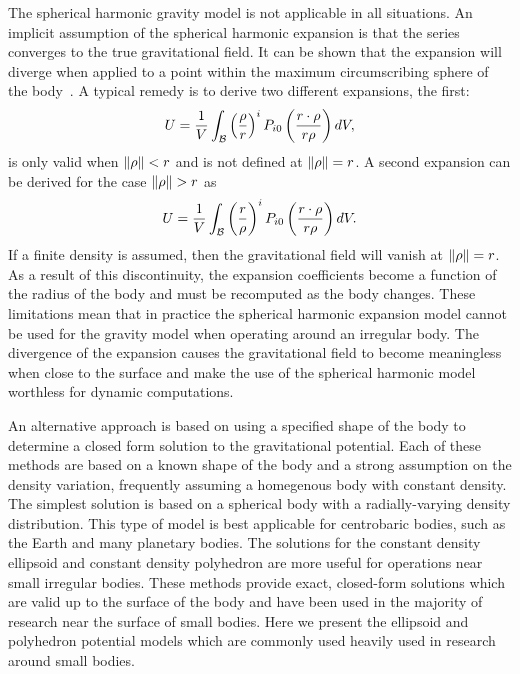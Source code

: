 The spherical harmonic gravity model is not applicable in all situations.
An implicit assumption of the spherical harmonic expansion is that the series converges to the true gravitational field.
It can be shown that the expansion will diverge when applied to a point within the maximum circumscribing sphere of the body~\cite{scheeres2012a}.
A typical remedy is to derive two different expansions, the first:
\begin{align}
    U = \frac{1}{V} \int_{\mathcal{B}} \left(  \frac{\rho}{r} \right)^i P_{i0} \left(  \frac{r \cdot \rho}{ r \rho} \right) dV, 
\end{align}
is only valid when \( \left\| \rho \right\| < r \) and is not defined at \( \left\| \rho \right\| = r\).
A second expansion can be derived for the case \(\left\| \rho \right\| > r \) as
\begin{align}
    U = \frac{1}{V} \int_{\mathcal{B}} \left(  \frac{r}{\rho} \right)^i P_{i0} \left(  \frac{r \cdot \rho}{ r \rho} \right) dV. 
\end{align}
If a finite density is assumed, then the gravitational field will vanish at \( \left\| \rho \right\| = r \).
As a result of this discontinuity, the expansion coefficients become a function of the radius of the body and must be recomputed as the body changes.
These limitations mean that in practice the spherical harmonic expansion model cannot be used for the gravity model when operating around an irregular body.
The divergence of the expansion causes the gravitational field to become meaningless when close to the surface and make the use of the spherical harmonic model worthless for dynamic computations.


An alternative approach is based on using a specified shape of the body to determine a closed form solution to the gravitational potential.
Each of these methods are based on a known shape of the body and a strong assumption on the density variation, frequently assuming a homegenous body with constant density.
The simplest solution is based on a spherical body with a radially-varying density distribution.
This type of model is best applicable for centrobaric bodies, such as the Earth and many planetary bodies.
The solutions for the constant density ellipsoid and constant density polyhedron are more useful for operations near small irregular bodies.
These methods provide exact, closed-form solutions which are valid up to the surface of the body and have been used in the majority of research near the surface of small bodies.
Here we present the ellipsoid and polyhedron potential models which are commonly used heavily used in research around small bodies.

